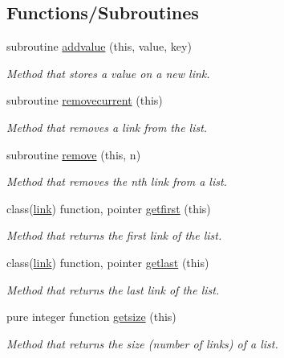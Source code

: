 \subsection*{Functions/\+Subroutines}
\begin{DoxyCompactItemize}
\item 
subroutine \mbox{\hyperlink{namespaceabstract__linkedlist__mod_a1075e2f234dacc9daf8407e14fac0929}{addvalue}} (this, value, key)
\begin{DoxyCompactList}\small\item\em Method that stores a value on a new link. \end{DoxyCompactList}\item 
subroutine \mbox{\hyperlink{namespaceabstract__linkedlist__mod_ae725ed63dd3b08d29e1c4ff824e05589}{removecurrent}} (this)
\begin{DoxyCompactList}\small\item\em Method that removes a link from the list. \end{DoxyCompactList}\item 
subroutine \mbox{\hyperlink{namespaceabstract__linkedlist__mod_a9f4028744d1ca6536e28c76d2795ace3}{remove}} (this, n)
\begin{DoxyCompactList}\small\item\em Method that removes the nth link from a list. \end{DoxyCompactList}\item 
class(\mbox{\hyperlink{structlink__mod_1_1link}{link}}) function, pointer \mbox{\hyperlink{namespaceabstract__linkedlist__mod_ad7b7ffee891627ae2b0548001650f72b}{getfirst}} (this)
\begin{DoxyCompactList}\small\item\em Method that returns the first link of the list. \end{DoxyCompactList}\item 
class(\mbox{\hyperlink{structlink__mod_1_1link}{link}}) function, pointer \mbox{\hyperlink{namespaceabstract__linkedlist__mod_a7c0a2e5b554e8859fc9b4d8fb52b124f}{getlast}} (this)
\begin{DoxyCompactList}\small\item\em Method that returns the last link of the list. \end{DoxyCompactList}\item 
pure integer function \mbox{\hyperlink{namespaceabstract__linkedlist__mod_ab4e548906863da517d7fedb02931b79f}{getsize}} (this)
\begin{DoxyCompactList}\small\item\em Method that returns the size (number of links) of a list. \end{DoxyCompactList}\item 

\end{DoxyCompactItemize}
